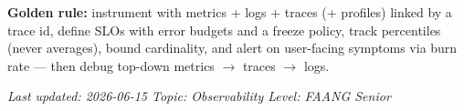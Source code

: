 \documentclass[11pt]{article}
\begin{document}
\textbf{Golden rule:} instrument with metrics + logs + traces (+ profiles) linked by a trace id, define SLOs with error budgets and a freeze policy, track percentiles (never averages), bound cardinality, and alert on user-facing symptoms via burn rate --- then debug top-down metrics \(\rightarrow\) traces \(\rightarrow\) logs.

\emph{Last updated: 2026-06-15 \textbar{} Topic: Observability \textbar{} Level: FAANG Senior}
\end{document}
